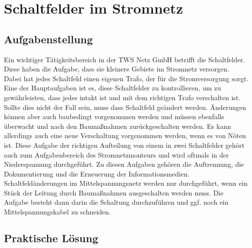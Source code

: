 \chapter{Schaltfelder im Stromnetz}
\label{cha:Schaltfelder}

\section{Aufgabenstellung}

Ein wichtiger Tätigkeitsbereich in der TWS Netz GmbH betrifft die Schaltfelder. Diese haben die Aufgabe, dass sie kleinere Gebiete im Stromnetz versorgen. 
Dabei hat jedes Schaltfeld einen eigenen Trafo, der für die Stromversorgung sorgt. Eine der Hauptaufgaben ist es, diese Schaltfelder zu kontrollieren, 
um zu gewährleisten, dass jedes intakt ist und mit dem richtigen Trafo verschalten ist. Sollte dies nicht der Fall sein, muss dass Schaltfeld geändert 
werden. Änderungen können aber auch baubedingt vorgenommen werden und müssen ebenfalls überwacht und nach den Baumaßnahmen zurückgeschalten werden. Es 
kann allerdings auch eine neue Verschaltung vorgenommen werden, wenn es von Nöten ist. Diese Aufgabe der richtigen Aufteilung von einem in zwei Schaltfelder 
gehört auch zum Aufgabenbereich des Stromnetzmonteurs und wird oftmals in der Niederspannung durchgeführt. Zu diesen Aufgaben gehören \zB die Auftrennung, 
die Dokumentierung und die Erneuerung der Informationsmedien. Schaltfeldänderungen im Mittelspannungsnetz werden nur durchgeführt, wenn ein Stück der 
Leitung durch Baumaßnahmen ausgeschalten werden muss. Die Aufgabe besteht dann darin die Schaltung durchzuführen und ggf. noch ein Mittelspannungskabel
zu schneiden.

\section{Praktische Lösung}

